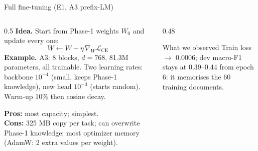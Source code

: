 \documentclass[aspectratio=169,11pt]{beamer}
\begin{document}
\begin{frame}{Full fine-tuning (E1, A3 prefix-LM)}
  \begin{columns}[T]
    \begin{column}{0.5\textwidth}
      \footnotesize
      \textbf{Idea.} Start from Phase-1 weights $W_0$ and update every one:
      $$W \leftarrow W - \eta\, \nabla_W \mathcal{L}_{\text{CE}}$$
      \textbf{Example.} A3: 8 blocks, $d=768$, 81.3M parameters, all trainable.
      Two learning rates: backbone $10^{-4}$ (small, keeps Phase-1 knowledge),
      new head $10^{-3}$ (starts random). Warm-up 10\% then cosine decay.
      \vspace{1mm}

      \textbf{Pros:} most capacity; simplest.\\
      \textbf{Cons:} 325 MB copy per task; can overwrite Phase-1 knowledge;
      most optimizer memory (AdamW: 2 extra values per weight).
    \end{column}
    \begin{column}{0.48\textwidth}
      \footnotesize
      \begin{center}
      \end{center}
      \begin{exampleblock}{What we observed}
        Train loss $\to$ 0.0006; dev macro-F1 stays at 0.39--0.44 from epoch 6:
        it memorises the 60 training documents.
      \end{exampleblock}
    \end{column}
  \end{columns}
\end{frame}
\end{document}
